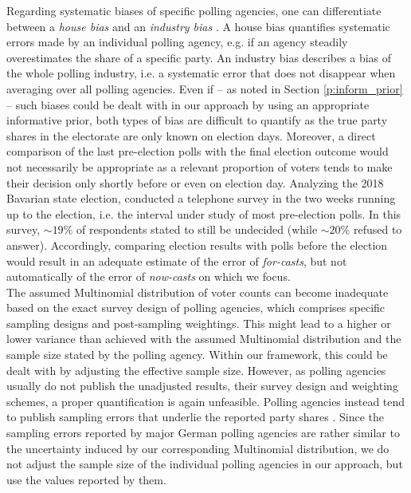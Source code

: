 \documentclass[smallextended]{svjour3}      %
\begin{document}
Regarding systematic biases of specific polling agencies, one can differentiate between a
\emph{house bias} and an \emph{industry bias} \citep[see e.g.][]{pickup_2011}.
A house bias quantifies systematic errors made by an individual polling agency,
e.g. if an agency steadily overestimates the share of a specific party.
An industry bias describes a bias of the whole polling industry, i.e.
a systematic error that does not disappear when averaging over all polling agencies.
Even if -- as noted in Section \ref{p:inform_prior} -- such biases could be dealt with in our
approach by using an appropriate informative prior, both types of bias are difficult to quantify as
the true party shares in the electorate are only known on election days.
Moreover, a direct comparison of the last pre-election polls
with the final election outcome would not necessarily be appropriate as a relevant proportion of voters
tends to make their decision only shortly before or even on election day.
Analyzing the 2018 Bavarian state election, \citet{usbw_2018} conducted a telephone survey
in the two weeks running up
to the election, i.e. the interval under study of most pre-election polls.
In this survey, $\sim 19\%$ of respondents stated to still be undecided (while $\sim 20\%$ refused to answer).
Accordingly, comparing election results with polls before the election would result in an adequate estimate of 
the error of \emph{for-casts}, but not automatically of the error of \emph{now-casts} on which we focus.\\

The assumed Multinomial distribution of voter counts can become inadequate based on
the exact survey design of polling agencies, which comprises specific sampling designs and post-sampling weightings.
This might lead to a higher or lower variance than achieved with the assumed Multinomial distribution and the sample size stated by the polling agency.
Within our framework, this could be dealt with by adjusting the effective sample size.
However, as polling agencies usually do not publish the unadjusted results, their survey design and weighting schemes, a proper quantification is again unfeasible.
Polling agencies instead tend to publish sampling errors that underlie the
reported party shares \citep[see e.g.][]{fgw_2019}.
Since the sampling errors reported by major German polling agencies are rather similar to the uncertainty
induced by our corresponding Multinomial distribution, 
we do not adjust the sample size of the individual polling agencies in our approach,
but use the values reported by them.
\end{document}
